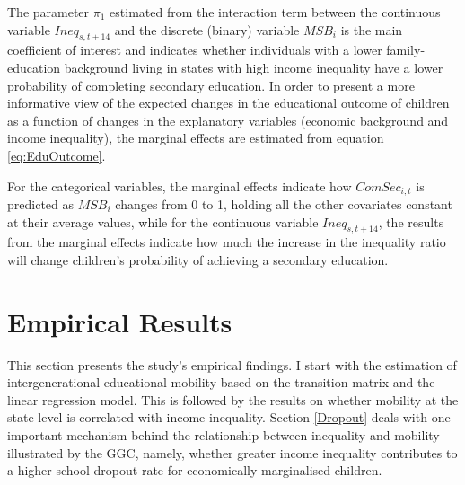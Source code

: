\documentclass[a4paper, 12pt]{article}
\begin{document}
The parameter $\pi_1$ estimated from the interaction term between the continuous variable $Ineq_{s,t+14}$ and the discrete (binary) variable $MSB_i$ is the main coefficient of interest and indicates whether individuals with a lower family-education background living in states with high income inequality have a lower probability of completing secondary education. In order to present a more informative view of the expected changes in the educational outcome of children as a function of changes in the explanatory variables (economic background and income inequality), the marginal effects are estimated from equation \eqref{eq:EduOutcome}.




For the categorical variables, the marginal effects indicate how $ComSec_{i,t}$ is predicted as $MSB_i$ changes from 0 to 1, holding all the other covariates constant at their average values, while for the continuous variable $Ineq_{s,t+14}$, the results from the marginal effects indicate how much the increase in the inequality ratio will change children’s probability of achieving a secondary education.







\section{Empirical Results} \label{Results}

This section presents the study’s empirical findings. I start with the estimation of intergenerational educational mobility based on the transition matrix and the linear regression model. This is followed by the results on whether mobility at the state level is correlated with income inequality. Section \ref{Dropout} deals with one important mechanism behind the relationship between inequality and mobility illustrated by the GGC, namely, whether greater income inequality contributes to a higher school-dropout rate for economically marginalised children.
\end{document}
